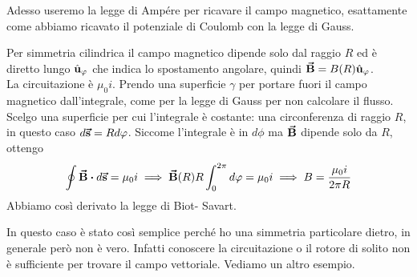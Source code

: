 
Adesso useremo la legge di Ampére per ricavare il campo magnetico, esattamente come abbiamo ricavato il potenziale di Coulomb con la legge di Gauss.
\begin{examplewt}
	Per simmetria cilindrica il campo magnetico dipende solo dal raggio $R$ ed è diretto lungo $\hat{\mathbf{u}}_\varphi$ che indica lo spostamento angolare, quindi $\vb*{\va{B}}=B(R)\hat{\mathbf{u}}_\varphi$.\\
	La circuitazione è $\mu_0 i$. Prendo una superficie $\gamma$ per portare fuori il campo magnetico dall'integrale, come per la legge di Gauss per non calcolare il flusso. Scelgo una superficie per cui l'integrale è costante: una circonferenza di raggio $R$, in questo caso $d\vb*{\va{s}}=Rd\varphi$. Siccome l'integrale è in $d\phi$ ma $\vb*{\va{B}}$ dipende solo da $R$, ottengo
	\begin{gather*}
		\oint\vba B\vdot d\vba s= \mu_0 i \implies \vba B(R)R\int^{2\pi}_0 d\phi=\mu_0 i \implies B=\frac{\mu_0 i}{2\pi R}
	\end{gather*}
	Abbiamo così derivato la legge di Biot- Savart. 
\end{examplewt}
In questo caso è stato così semplice perché ho una simmetria particolare dietro, in generale però non è vero. Infatti conoscere la circuitazione o il rotore di solito non è sufficiente per trovare il campo vettoriale. Vediamo un altro esempio.


